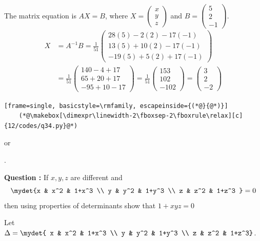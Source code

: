 \begin{enumerate}[label=\thesubsection.\arabic*, ref=\thesubsection.\theenumi]
The matrix equation is $AX = B$, where $X = \begin{pmatrix} x \\ y \\ z \end{pmatrix}$ and $B = \begin{pmatrix} 5 \\ 2 \\ -1 \end{pmatrix}$.
\begin{align*}
X &= A^{-1}B = \frac{1}{51} \begin{pmatrix} 28(5) - 2(2) - 17(-1) \\ 13(5) + 10(2) - 17(-1) \\ -19(5) + 5(2) + 17(-1) \end{pmatrix} \\
&= \frac{1}{51} \begin{pmatrix} 140 - 4 + 17 \\ 65 + 20 + 17 \\ -95 + 10 - 17 \end{pmatrix} = \frac{1}{51} \begin{pmatrix} 153 \\ 102 \\ -102 \end{pmatrix} = \begin{pmatrix} 3 \\ 2 \\ -2 \end{pmatrix}
\end{align*}





\begin{lstlisting}[frame=single, basicstyle=\rmfamily, escapeinside={(*@}{@*)}]
	(*@\makebox[\dimexpr\linewidth-2\fboxsep-2\fboxrule\relax][c]{12/codes/q34.py}@*)
\end{lstlisting}
\begin{center}
    or 
\end{center}.


\textbf{Question :} If $x, y, z$ are different and 
$$\mydet {x & x^2 & 1+x^3 \\ y & y^2 & 1+y^3 \\ z & z^2 & 1+z^3 } = 0$$
then using properties of determinants show that $1+xyz=0$

\solution

Let $\Delta = \mydet{ x & x^2 & 1+x^3 \\ y & y^2 & 1+y^3 \\ z & z^2 & 1+z^3}$.


\end{enumerate}
